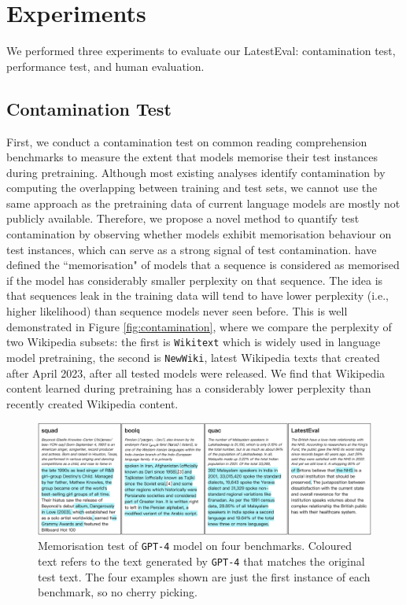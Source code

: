 \documentclass[letterpaper]{article} %
\begin{document}
\section{Experiments}

We performed three experiments to evaluate our LatestEval: contamination test, performance test, and human evaluation.

\subsection{Contamination Test}
First, we conduct a contamination test on common reading comprehension benchmarks to measure the extent that models memorise their test instances during pretraining. Although most existing analyses identify contamination by computing the overlapping between training and test sets, 
we cannot use the same approach as the pretraining data of current language models are mostly not publicly available.
Therefore, we propose a novel method to quantify test contamination by observing whether models exhibit memorisation behaviour on test instances, which can serve as a strong signal of test contamination. \citet{carlini2021extracting,carlini2022quantifying} have defined the ``memorisation" of models that a sequence is considered as memorised if the model has considerably smaller perplexity on that sequence. The idea is that sequences leak in the training data will tend to have lower perplexity (i.e., higher likelihood) than sequence models never seen before. This is well demonstrated in Figure \ref{fig:contamination}, where we compare the perplexity of two Wikipedia subsets: the first is \texttt{Wikitext} \cite{merity2016pointer} which is widely used in language model pretraining, the second is \texttt{NewWiki}, latest Wikipedia texts that created after April 2023, after all tested models were released. We find that Wikipedia content learned during pretraining has a considerably lower perplexity than recently created Wikipedia content.

\begin{figure}[t]
    \centering
    \includegraphics[width=\textwidth]{visualisation.png}
    \caption{Memorisation test of \texttt{GPT-4} model on four benchmarks. Coloured text refers to the text generated by \texttt{GPT-4} that matches the original test text. The four examples shown are just the first instance of each benchmark, so no cherry picking.}
    \label{fig:visualisation}
\end{figure}
\end{document}
